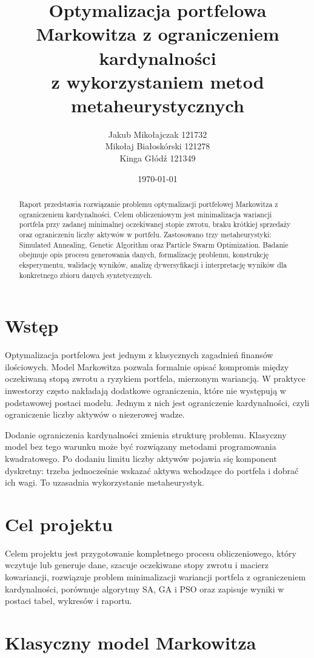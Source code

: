 \documentclass[12pt,a4paper]{article}
\title{Optymalizacja portfelowa Markowitza z ograniczeniem kardynalności\\z wykorzystaniem metod metaheurystycznych}
\author{Jakub Mikołajczak 121732 \\
Mikołaj Białoskórski 121278 \\
Kinga Głódź 121349}
\date{\today}
\begin{document}
\maketitle


\begin{abstract}
Raport przedstawia rozwiązanie problemu optymalizacji portfelowej Markowitza z ograniczeniem kardynalności. Celem obliczeniowym jest minimalizacja wariancji portfela przy zadanej minimalnej oczekiwanej stopie zwrotu, braku krótkiej sprzedaży oraz ograniczeniu liczby aktywów w portfelu. Zastosowano trzy metaheurystyki: Simulated Annealing, Genetic Algorithm oraz Particle Swarm Optimization. Badanie obejmuje opis procesu generowania danych, formalizację problemu, konstrukcję eksperymentu, walidację wyników, analizę dywersyfikacji i interpretację wyników dla konkretnego zbioru danych syntetycznych.
\end{abstract}
\newpage
\tableofcontents
\newpage

\section{Wstęp}
Optymalizacja portfelowa jest jednym z klasycznych zagadnień finansów ilościowych. Model Markowitza pozwala formalnie opisać kompromis między oczekiwaną stopą zwrotu a ryzykiem portfela, mierzonym wariancją. W praktyce inwestorzy często nakładają dodatkowe ograniczenia, które nie występują w podstawowej postaci modelu. Jednym z nich jest ograniczenie kardynalności, czyli ograniczenie liczby aktywów o niezerowej wadze.

Dodanie ograniczenia kardynalności zmienia strukturę problemu. Klasyczny model bez tego warunku może być rozwiązany metodami programowania kwadratowego. Po dodaniu limitu liczby aktywów pojawia się komponent dyskretny: trzeba jednocześnie wskazać aktywa wchodzące do portfela i dobrać ich wagi. To uzasadnia wykorzystanie metaheurystyk.

\section{Cel projektu}
Celem projektu jest przygotowanie kompletnego procesu obliczeniowego, który wczytuje lub generuje dane, szacuje oczekiwane stopy zwrotu i macierz kowariancji, rozwiązuje problem minimalizacji wariancji portfela z ograniczeniem kardynalności, porównuje algorytmy SA, GA i PSO oraz zapisuje wyniki w postaci tabel, wykresów i raportu.

\section{Klasyczny model Markowitza}
\end{document}
